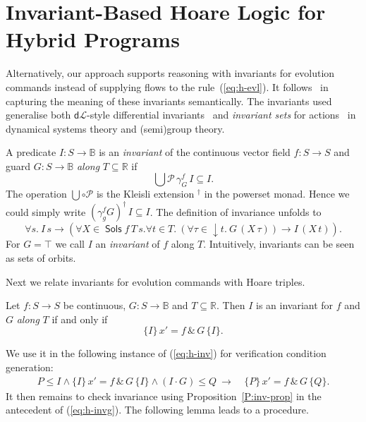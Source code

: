 \documentclass[envcountsame]{llncs}
\newcommand{\dL}{\mathsf{d}\mathcal{L}}
\newcommand{\Pow}{\mathcal{P}}
\newcommand{\reals}{\mathbb{R}}
\newcommand{\bools}{\mathbb{B}}
\newcommand{\Sols}{\mathop{\mathsf{Sols}}}
\newcommand\notein[3]{\todo[inline,linecolor=orange!80!black,backgroundcolor=#2!20]{#1: #3}%
}
\newcommand{\gin}[1]{\notein{{\bf GS}}{gcolor}{#1}}
\begin{document}
\gin{add example: thermostat (done)}



\section{Invariant-Based Hoare Logic for Hybrid Programs}\label{sec:hoare-inv}

Alternatively, our approach supports reasoning with invariants for
evolution commands instead of supplying flows to the
rule~(\ref{eq:h-evl}). It follows~\cite{MuniveS19} in capturing the
meaning of these invariants semantically. The invariants used
generalise both $\dL$-style differential invariants~\cite{Platzer12}
and \emph{invariant sets} for actions~\cite{Teschl12} in dynamical
systems theory and (semi)group theory.

A predicate $I:S\to\bools$ is an \emph{invariant} of the continuous
vector field $f:S\to S$ and guard $G:S\to\bools$ \emph{along}
$T\subseteq \reals$ if
\begin{equation*}
\bigcup \Pow\, \gamma^f_G\, I\subseteq  I.
\end{equation*}
The operation $\bigcup\circ\Pow$ is the Kleisli extension $^\dagger$
in the powerset monad. Hence we could simply write
$(\gamma^f_gG)^\dagger\, I \subseteq I$. The definition of invariance
unfolds to
\begin{equation*}
  \forall s.\ I\, s \to (\forall X\in\Sols f\, T\, s.\forall t\in T.\ (\forall \tau\in {\downarrow}t.\ G\, (X\, \tau)) \to I\, (X\, t)).
\end{equation*}
For $G=\top$ we call $I$ an \emph{invariant} of $f$ along $T$.
Intuitively, invariants can be seen as sets of orbits.

Next we relate invariants for evolution commands with Hoare triples.
\begin{proposition}\label{P:inv-prop}
  Let $f:S\to S$ be continuous, $G:S\to\bools$ and
  $T\subseteq \reals$. Then $I$ is an invariant for $f$ and $G$ \emph{along} $T$ if and only if
\begin{equation*}
 \{I\}\, x' = f\, \&\, G\, \{I\}.
\end{equation*}
\end{proposition}
We use it in the following instance of (\ref{eq:h-inv}) for verification condition generation:
\begin{align}
  P\le I \land \{I\}\, x' = f\, \&\, G\, \{I\}\land (I\cdot G)\le Q\ \rightarrow\
  &\{P\}\, x' = f\, \&\, G\, \{Q\}.\label{eq:h-invg}\tag{h-invg}
\end{align}
It then remains to check invariance using Proposition~\ref{P:inv-prop}
in the antecedent of (\ref{eq:h-invg}). The following lemma leads to a procedure.
\end{document}
